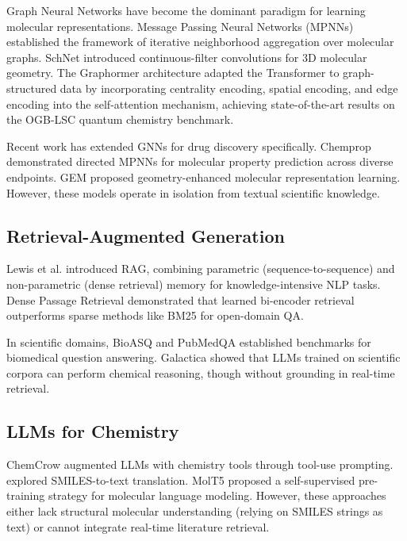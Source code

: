 \documentclass[conference]{IEEEtran}
\begin{document}
Graph Neural Networks have become the dominant paradigm for learning molecular representations. Message Passing Neural Networks (MPNNs) \cite{gilmer2017mpnn} established the framework of iterative neighborhood aggregation over molecular graphs. SchNet \cite{schutt2017schnet} introduced continuous-filter convolutions for 3D molecular geometry. The Graphormer architecture \cite{ying2021graphormer} adapted the Transformer \cite{vaswani2017attention} to graph-structured data by incorporating centrality encoding, spatial encoding, and edge encoding into the self-attention mechanism, achieving state-of-the-art results on the OGB-LSC quantum chemistry benchmark.

Recent work has extended GNNs for drug discovery specifically. Chemprop \cite{yang2019chemprop} demonstrated directed MPNNs for molecular property prediction across diverse endpoints. GEM \cite{fang2022gem} proposed geometry-enhanced molecular representation learning. However, these models operate in isolation from textual scientific knowledge.

\subsection{Retrieval-Augmented Generation}

Lewis et al. \cite{lewis2020rag} introduced RAG, combining parametric (sequence-to-sequence) and non-parametric (dense retrieval) memory for knowledge-intensive NLP tasks. Dense Passage Retrieval \cite{karpukhin2020dpr} demonstrated that learned bi-encoder retrieval outperforms sparse methods like BM25 for open-domain QA.

In scientific domains, BioASQ \cite{tsatsaronis2015bioasq} and PubMedQA \cite{jin2019pubmedqa} established benchmarks for biomedical question answering. Galactica \cite{taylor2022galactica} showed that LLMs trained on scientific corpora can perform chemical reasoning, though without grounding in real-time retrieval.

\subsection{LLMs for Chemistry}

ChemCrow \cite{bran2023chemcrow} augmented LLMs with chemistry tools through tool-use prompting. \cite{edwards2022translation} explored SMILES-to-text translation. MolT5 \cite{edwards2022molt5} proposed a self-supervised pre-training strategy for molecular language modeling. However, these approaches either lack structural molecular understanding (relying on SMILES strings as text) or cannot integrate real-time literature retrieval.
\end{document}
